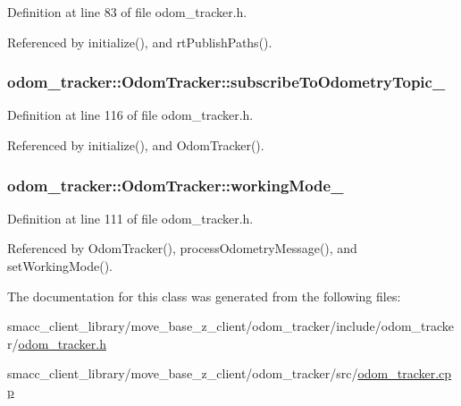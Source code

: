 Definition at line 83 of file odom\+\_\+tracker.\+h.



Referenced by initialize(), and rt\+Publish\+Paths().

\subsubsection[{\texorpdfstring{subscribe\+To\+Odometry\+Topic\+\_\+}{subscribeToOdometryTopic_}}]{ odom\+\_\+tracker\+::\+Odom\+Tracker\+::subscribe\+To\+Odometry\+Topic\+\_\+\hspace{0.3cm}{\ttfamily [protected]}}\hypertarget{classodom__tracker_1_1OdomTracker_ae8ddf26c78b4bb30b162d30721d761f6}{}\label{classodom__tracker_1_1OdomTracker_ae8ddf26c78b4bb30b162d30721d761f6}


Definition at line 116 of file odom\+\_\+tracker.\+h.



Referenced by initialize(), and Odom\+Tracker().

\subsubsection[{\texorpdfstring{working\+Mode\+\_\+}{workingMode_}}]{ odom\+\_\+tracker\+::\+Odom\+Tracker\+::working\+Mode\+\_\+\hspace{0.3cm}{\ttfamily [protected]}}\hypertarget{classodom__tracker_1_1OdomTracker_ab3b29200405d9a88cf3213656b14d7c0}{}\label{classodom__tracker_1_1OdomTracker_ab3b29200405d9a88cf3213656b14d7c0}


Definition at line 111 of file odom\+\_\+tracker.\+h.



Referenced by Odom\+Tracker(), process\+Odometry\+Message(), and set\+Working\+Mode().



The documentation for this class was generated from the following files\+:\begin{DoxyCompactItemize}
\item 
smacc\+\_\+client\+\_\+library/move\+\_\+base\+\_\+z\+\_\+client/odom\+\_\+tracker/include/odom\+\_\+tracker/\hyperlink{odom__tracker_8h}{odom\+\_\+tracker.\+h}\item 
smacc\+\_\+client\+\_\+library/move\+\_\+base\+\_\+z\+\_\+client/odom\+\_\+tracker/src/\hyperlink{odom__tracker_8cpp}{odom\+\_\+tracker.\+cpp}\end{DoxyCompactItemize}
